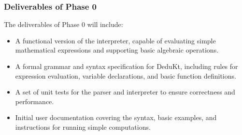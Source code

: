 \subsubsection{Deliverables of Phase 0}
The deliverables of Phase 0 will include:
\begin{itemize}
    \item A functional version of the interpreter, capable of evaluating simple mathematical expressions and supporting basic algebraic operations.
    \item A formal grammar and syntax specification for DeduKt, including rules for expression evaluation, variable declarations, and basic function definitions.
    \item A set of unit tests for the parser and interpreter to ensure correctness and performance.
    \item Initial user documentation covering the syntax, basic examples, and instructions for running simple computations.
\end{itemize}

